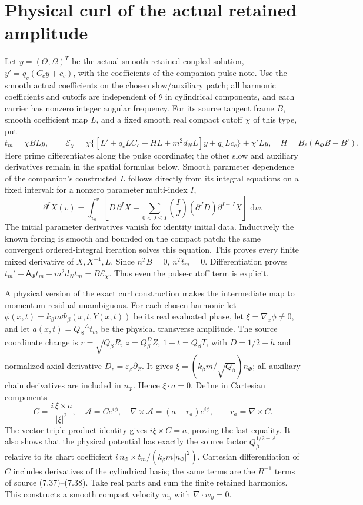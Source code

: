 \documentclass[11pt]{article}
\newcommand{\dd}{\,\mathrm d}
\begin{document}
\section{Physical curl of the actual retained amplitude}
Let $y=(\Theta,\Omega)^T$ be the actual smooth retained coupled solution,
$y'=q_v(C_cy+c_c)$, with the coefficients of the companion pulse note.
Use the smooth actual coefficients on the chosen slow/auxiliary patch;
all harmonic coefficients and cutoffs are independent of $\theta$ in
cylindrical components, and each carrier has nonzero integer angular
frequency. For its source tangent frame $B$, smooth coefficient map $L$,
and a fixed smooth real compact cutoff $\chi$ of this type, put
\[
 t_m=\chi BLy,\qquad
 \mathcal E_\chi=
 \chi\{[L'+q_vLC_c-HL+m^2d_NL]y+q_vLc_c\}+\chi'Ly,
 \quad H=B_\ell(\mathsf A_\Phi B-B').
\]
Here prime differentiates along the pulse coordinate; the other slow
and auxiliary derivatives remain in the spatial formulas below.
Smooth parameter dependence of the companion's constructed $L$ follows
directly from its integral equations on a fixed interval: for a nonzero
parameter multi-index $I$,
\[
 \partial^I X(v)=
 \int_{v_0}^v\left[D\,\partial^I X+
 \sum_{0<J\le I}\binom{I}{J}(\partial^JD)
                                 \partial^{I-J}X\right]\,\dd w .
\]
The initial parameter derivatives vanish for identity initial data.
Inductively the known forcing is smooth and bounded on the compact patch;
the same convergent ordered-integral iteration solves this equation.
This proves every finite mixed derivative of $X,X^{-1},L$.
Since $n^TB=0$, $n^Tt_m=0$. Differentiation proves
$t_m'-\mathsf A_\Phi t_m+m^2d_Nt_m=B\mathcal E_\chi$.
Thus even the pulse-cutoff term is explicit.

A physical version of the exact curl construction makes the intermediate
map to momentum residual unambiguous. For each chosen harmonic let
$\phi(x,t)=k_\beta m\Phi_\beta(x,t,Y(x,t))$ be its real evaluated phase,
let $\xi=\nabla_x\phi\ne0$, and let $a(x,t)=Q_\beta^{-A}t_m$ be the
physical transverse amplitude. The source coordinate change is
$r=\sqrt{Q_\beta}R$, $z=Q_\beta^D Z$, $1-t=Q_\beta T$,
with $D=1/2-h$ and normalized axial derivative
$D_z=\varepsilon_\beta\partial_Z$. It gives
$\xi=(k_\beta m/\sqrt{Q_\beta})n_\Phi$; all auxiliary chain derivatives
are included in $n_\Phi$. Hence $\xi\cdot a=0$. Define in Cartesian
components
\begin{equation}
 C=\frac{i\,\xi\times a}{|\xi|^2},\quad
 \mathcal A=C e^{i\phi},\quad
 \nabla\times\mathcal A=(a+r_a)e^{i\phi},\qquad
 r_a=\nabla\times C. \label{nsbridge:cb:curl}
\end{equation}
The vector triple-product identity gives
$i\xi\times C=a$, proving the last equality. It also shows that the
physical potential has exactly the source factor $Q_\beta^{1/2-A}$
relative to its chart coefficient
$i\,n_\Phi\times t_m/(k_\beta m|n_\Phi|^2)$.
Cartesian differentiation of $C$ includes derivatives of the cylindrical
basis; the same terms are the $R^{-1}$ terms of source (7.37)--(7.38).
Take real parts and sum the finite retained harmonics. This constructs
a smooth compact velocity $w_y$ with $\nabla\cdot w_y=0$.
\end{document}
